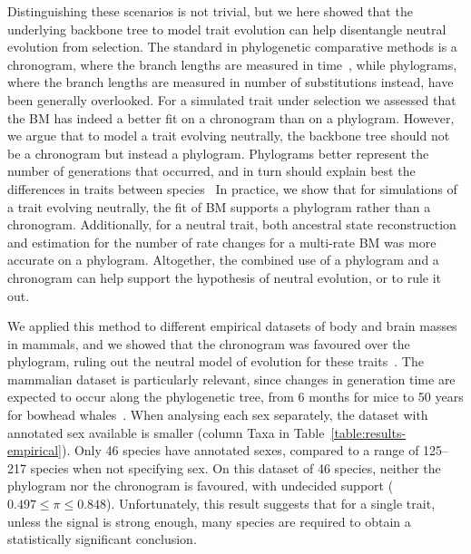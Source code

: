 \documentclass{article}
\newcommand{\PhyloSupport}{\pi}
\begin{document}
Distinguishing these scenarios is not trivial, but we here showed that the underlying backbone tree to model trait evolution can help disentangle neutral evolution from selection.
The standard in phylogenetic comparative methods is a chronogram, where the branch lengths are measured in time~\citep{felsenstein_phylogenies_1985, harmon_phylogenetic_2018}, while phylograms, where the branch lengths are measured in number of substitutions instead, have been generally overlooked.
For a simulated trait under selection we assessed that the BM has indeed a better fit on a chronogram than on a phylogram.
However, we argue that to model a trait evolving neutrally, the backbone tree should not be a chronogram but instead a phylogram.
Phylograms better represent the number of generations that occurred, and in turn should explain best the differences in traits between species~\citep{latrille_detecting_2024}
In practice, we show that for simulations of a trait evolving neutrally, the fit of BM supports a phylogram rather than a chronogram.
Additionally, for a neutral trait, both ancestral state reconstruction and estimation for the number of rate changes for a multi-rate BM was more accurate on a phylogram.
Altogether, the combined use of a phylogram and a chronogram can help support the hypothesis of neutral evolution, or to rule it out.

We applied this method to different empirical datasets of body and brain masses in mammals, and we showed that the chronogram was favoured over the phylogram, ruling out the neutral model of evolution for these traits~\citep{latrille_detecting_2024}.
The mammalian dataset is particularly relevant, since changes in generation time are expected to occur along the phylogenetic tree, from 6 months for mice to 50 years for bowhead whales~\citep{demagalhaes_database_2009, nielsen_eye_2016}.
When analysing each sex separately, the dataset with annotated sex available is smaller (column Taxa in Table~\ref{table:results-empirical}).
Only 46 species have annotated sexes, compared to a range of 125--217 species when not specifying sex.
On this dataset of 46 species, neither the phylogram nor the chronogram is favoured, with undecided support ($0.497 \leq \PhyloSupport \leq 0.848$).
Unfortunately, this result suggests that for a single trait, unless the signal is strong enough, many species are required to obtain a statistically significant conclusion.
\end{document}
